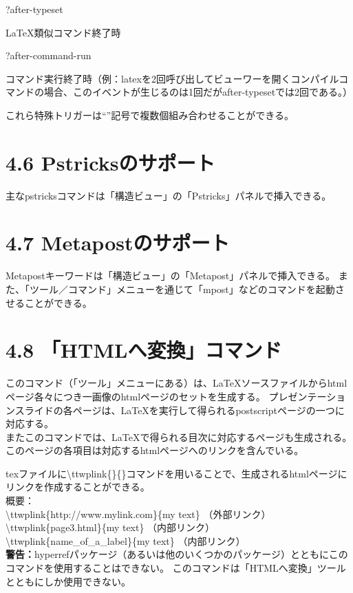 \documentclass[]{book}
\begin{document}
?after-typeset

LaTeX類似コマンド終了時

?after-command-run

コマンド実行終了時（例：latexを2回呼び出してビューワーを開くコンパイルコマンドの場合、このイベントが生じるのは1回だがafter-typesetでは2回である。）

これら特殊トリガーは``\textbar{}''記号で複数個組み合わせることができる。

\section{4.6 Pstricksのサポート}

主なpstricksコマンドは「構造ビュー」の「Pstricks」パネルで挿入できる。

\section{4.7 Metapostのサポート}

Metapostキーワードは「構造ビュー」の「Metapost」パネルで挿入できる。
また、「ツール／コマンド」メニューを通じて「mpost」などのコマンドを起動させることができる。

\section{4.8 「HTMLへ変換」コマンド}

このコマンド（「ツール」メニューにある）は、LaTeXソースファイルからhtmlページ各々につき一画像のhtmlページのセットを生成する。
プレゼンテーションスライドの各ページは、LaTeXを実行して得られるpostscriptページの一つに対応する。\\
またこのコマンドでは、LaTeXで得られる目次に対応するページも生成される。
このページの各項目は対応するhtmlページへのリンクを含んでいる。

texファイルに\textbackslash{}ttwplink\{\}\{\}コマンドを用いることで、生成されるhtmlページにリンクを作成することができる。\\
概要：\\ \textbackslash{}ttwplink\{http://www.mylink.com\}\{my text\}
（外部リンク）\\ \textbackslash{}ttwplink\{page3.html\}\{my text\}
（内部リンク）\\ \textbackslash{}ttwplink\{name\_of\_a\_label\}\{my text\}
（内部リンク）\\
\textbf{警告：}hyperrefパッケージ（あるいは他のいくつかのパッケージ）とともにこのコマンドを使用することはできない。
このコマンドは「HTMLへ変換」ツールとともにしか使用できない。
\end{document}
